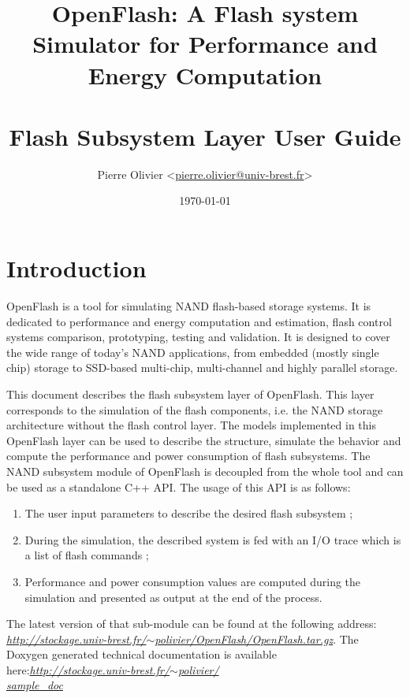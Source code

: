 \title{\textbf{OpenFlash: A Flash system Simulator for Performance and Energy Computation}\\~\\Flash Subsystem Layer User Guide}
\author{Pierre Olivier <\href{mailto:pierre.olivier@univ-brest.fr}{pierre.olivier@univ-brest.fr}>}
\date{\today}

\maketitle

\tableofcontents

\chapter*{Introduction}
OpenFlash is a tool for simulating NAND flash-based storage systems. It is dedicated to performance and energy computation and estimation, flash control systems comparison, prototyping, testing and validation. It is designed to cover the wide range of today's NAND applications, from embedded (mostly single chip) storage to SSD-based multi-chip, multi-channel and highly parallel storage.

This document describes the flash subsystem layer of OpenFlash. This layer corresponds to the simulation of the flash components, i.e. the NAND storage architecture without the flash control layer. The models implemented in this OpenFlash layer can be used to describe the structure, simulate the behavior and compute the performance and power consumption of flash subsystems. The NAND subsystem module of OpenFlash is decoupled from the whole tool and can be used as a standalone C++ API. The usage of this API is as follows:
\begin{enumerate}
  \item The user input parameters to describe the desired flash subsystem ;
  \item During the simulation, the described system is fed with an I/O trace which is a list of flash commands ;
  \item Performance and power consumption values are computed during the simulation and presented as output at the end of the process.
\end{enumerate}

The latest version of that sub-module can be found at the following address: \href{http://stockage.univ-brest.fr/~polivier/OpenFlash/OpenFlash.tar.gz}{\textit{http://stockage.univ-brest.fr/$\sim$polivier/OpenFlash/OpenFlash.tar.gz}}. The Doxygen generated technical documentation is available here:\href{http://stockage.univ-brest.fr/~polivier/sample_doc}{\textit{http://stockage.univ-brest.fr/$\sim$polivier/\\sample\_doc}}

